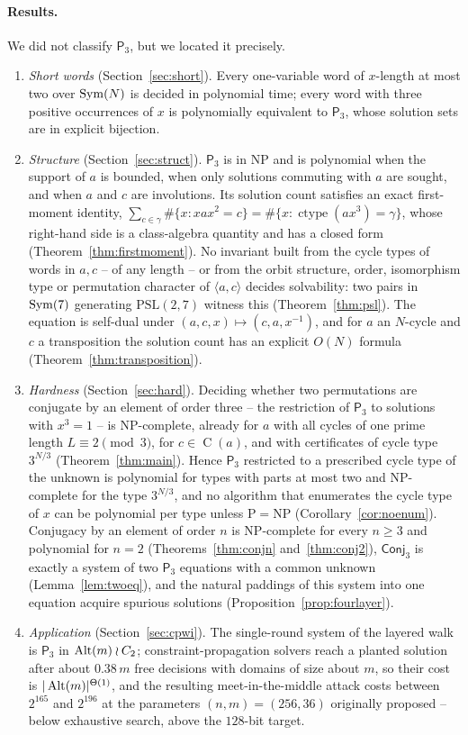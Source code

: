 \documentclass[preprint,12pt]{elsarticle}
\theoremstyle{definition}\newtheorem{defi}[thm]{Definition}\newtheorem{prob}[thm]{Problem}\newtheorem{obs}[thm]{Observation}
\theoremstyle{remark}\newtheorem{rem}[thm]{Remark}
\newcommand{\ctype}{\operatorname{ctype}}\DeclareMathOperator{\Cent}{C}\DeclareMathOperator{\supp}{supp}
\newcommand{\Pthree}{\mathsf{P}_3}\newcommand{\Conj}[1]{\mathsf{Conj}_{#1}}\newcommand{\Dzero}{\Conj{3}}\newcommand{\TR}{T_{\mathcal R}}
\begin{document}
\paragraph{Results.} We did not classify $\Pthree$, but we located it precisely.
\begin{enumerate}
\item \emph{Short words} (Section~\ref{sec:short}). Every one-variable word of $x$-length at most two over $\operatorname{Sym}(N)$ is decided in polynomial time; every word with three positive occurrences of $x$ is polynomially equivalent to $\Pthree$, whose solution sets are in explicit bijection.
\item \emph{Structure} (Section~\ref{sec:struct}). $\Pthree$ is in NP and is polynomial when the support of $a$ is bounded, when only solutions commuting with $a$ are sought, and when $a$ and $c$ are involutions. Its solution count satisfies an exact first-moment identity, $\sum_{c\in\gamma}\#\{x:xax^{2}=c\}=\#\{x:\ctype(ax^{3})=\gamma\}$, whose right-hand side is a class-algebra quantity and has a closed form (Theorem~\ref{thm:firstmoment}). No invariant built from the cycle types of words in $a,c$ -- of any length -- or from the orbit structure, order, isomorphism type or permutation character of $\langle a,c\rangle$ decides solvability: two pairs in $\operatorname{Sym}(7)$ generating $\mathrm{PSL}(2,7)$ witness this (Theorem~\ref{thm:psl}). The equation is self-dual under $(a,c,x)\mapsto(c,a,x^{-1})$, and for $a$ an $N$-cycle and $c$ a transposition the solution count has an explicit $O(N)$ formula (Theorem~\ref{thm:transposition}).
\item \emph{Hardness} (Section~\ref{sec:hard}). Deciding whether two permutations are conjugate by an element of order three -- the restriction of $\Pthree$ to solutions with $x^{3}=1$ -- is NP-complete, already for $a$ with all cycles of one prime length $L\equiv2\pmod3$, for $c\in\Cent(a)$, and with certificates of cycle type $3^{N/3}$ (Theorem~\ref{thm:main}). Hence $\Pthree$ restricted to a prescribed cycle type of the unknown is polynomial for types with parts at most two and NP-complete for the type $3^{N/3}$, and no algorithm that enumerates the cycle type of $x$ can be polynomial per type unless $\mathrm P=\mathrm{NP}$ (Corollary~\ref{cor:noenum}). Conjugacy by an element of order $n$ is NP-complete for every $n\ge3$ and polynomial for $n=2$ (Theorems~\ref{thm:conjn} and~\ref{thm:conj2}), $\Dzero$ is exactly a system of two $\Pthree$ equations with a common unknown (Lemma~\ref{lem:twoeq}), and the natural paddings of this system into one equation acquire spurious solutions (Proposition~\ref{prop:fourlayer}).
\item \emph{Application} (Section~\ref{sec:cpwi}). The single-round system of the layered walk is $\Pthree$ in $\operatorname{Alt}(m)\wr C_2$; constraint-propagation solvers reach a planted solution after about $0.38\,m$ free decisions with domains of size about $m$, so their cost is $|\operatorname{Alt}(m)|^{\Theta(1)}$, and the resulting meet-in-the-middle attack costs between $2^{165}$ and $2^{196}$ at the parameters $(n,m)=(256,36)$ originally proposed -- below exhaustive search, above the $128$-bit target.
\end{enumerate}
\end{document}
